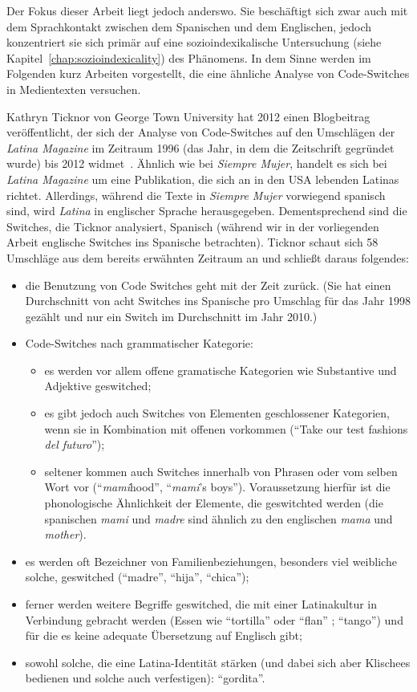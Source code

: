 Der Fokus dieser Arbeit liegt jedoch anderswo.
Sie beschäftigt sich zwar auch mit dem Sprachkontakt zwischen dem Spanischen und dem Englischen, jedoch konzentriert sie sich primär auf eine sozioindexikalische Untersuchung (siehe Kapitel~\ref{chap:sozioindexicality}) des Phänomens.
In dem Sinne werden im Folgenden kurz Arbeiten vorgestellt, die eine ähnliche Analyse von Code-Switches in Medientexten versuchen.

Kathryn Ticknor von George Town University hat 2012 einen Blogbeitrag veröffentlicht, der sich der Analyse von Code-Switches auf den Umschlägen der \textit{Latina Magazine} im Zeitraum 1996 (das Jahr, in dem die Zeitschrift gegründet wurde) bis 2012 widmet~\cite[]{Ticknor12}.
Ähnlich wie bei \textit{Siempre Mujer}, handelt es sich bei \textit{Latina Magazine} um eine Publikation, die sich an in den USA lebenden Latinas richtet.
Allerdings, während die Texte in \textit{Siempre Mujer} vorwiegend spanisch sind, wird \textit{Latina} in englischer Sprache herausgegeben.
Dementsprechend sind die Switches, die Ticknor analysiert, Spanisch (während wir in der vorliegenden Arbeit englische Switches ins Spanische betrachten).
Ticknor schaut sich 58 Umschläge aus dem bereits erwähnten Zeitraum an und schließt daraus folgendes:
\begin{itemize}
  \item die Benutzung von Code Switches geht mit der Zeit zurück. (Sie hat einen Durchschnitt von acht Switches ins Spanische pro Umschlag für das Jahr 1998 gezählt und nur ein Switch im Durchschnitt im Jahr 2010.)
  \item Code-Switches nach grammatischer Kategorie:
    \begin{itemize}
      \item es werden vor allem offene gramatische Kategorien wie Substantive und Adjektive geswitched;
      \item es gibt jedoch auch Switches von Elementen geschlossener Kategorien, wenn sie in Kombination mit offenen vorkommen (``Take our test fashions \textit{del futuro}'');
      \item seltener kommen auch Switches innerhalb von Phrasen oder vom selben Wort vor (``\textit{mami}hood'', ``\textit{mami}'s boys''). Voraussetzung hierfür ist die phonologische Ähnlichkeit der Elemente, die geswitchted werden (die spanischen \textit{mami} und \textit{madre} sind ähnlich zu den englischen \textit{mama} und \textit{mother}).
    \end{itemize}
  \item es werden oft Bezeichner von Familienbeziehungen, besonders viel weibliche solche, geswitched (``madre'', ``hija'', ``chica'');
  \item ferner werden weitere Begriffe geswitched, die mit einer Latinakultur in Verbindung gebracht werden (Essen wie ``tortilla'' oder ``flan'' ; ``tango'') und für die es keine adequate Übersetzung auf Englisch gibt;
  \item sowohl solche, die eine Latina-Identität stärken (und dabei sich aber Klischees bedienen und solche auch verfestigen): ``gordita''.
\end{itemize}

